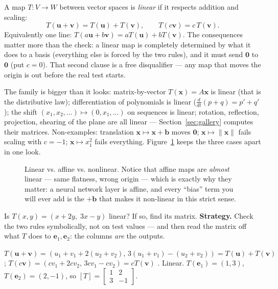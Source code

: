 A map $T:V\to W$ between vector spaces is \emph{linear} if it respects addition and scaling:
\[
  T(\mathbf{u}+\mathbf{v}) = T(\mathbf{u})+T(\mathbf{v}),\qquad
  T(c\mathbf{v}) = c\,T(\mathbf{v}).
\]
Equivalently one line: $T(a\mathbf{u}+b\mathbf{v})=aT(\mathbf{u})+bT(\mathbf{v})$. The consequences matter more than the check: a linear map is completely determined by what it does to a basis (everything else is forced by the two rules), and it must send $\mathbf 0$ to $\mathbf 0$ (put $c=0$). That second clause is a free disqualifier — any map that moves the origin is out before the real test starts.

The family is bigger than it looks: matrix-by-vector $T(\mathbf{x})=A\mathbf{x}$ is linear (that is the distributive law); differentiation of polynomials is linear ($\frac{d}{dt}(p+q)=p'+q'$); the shift $(x_1,x_2,\dots)\mapsto(0,x_1,\dots)$ on sequences is linear; rotation, reflection, projection, shearing of the plane are all linear — Section~\ref{sec:gallery} computes their matrices. Non-examples: translation $\mathbf{x}\mapsto\mathbf{x}+\mathbf{b}$ moves $\mathbf 0$; $\mathbf{x}\mapsto\|\mathbf{x}\|$ fails scaling with $c=-1$; $\mathbf{x}\mapsto x_1^2$ fails everything. Figure~\ref{fig:affine} keeps the three cases apart in one look.

\begin{figure}[htbp]
\centering

\caption{Linear vs. affine vs. nonlinear. Notice that affine maps are \emph{almost} linear — same flatness, wrong origin — which is exactly why they matter: a neural network layer is affine, and every ``bias'' term you will ever add is the $+\mathbf b$ that makes it non-linear in this strict sense.}
\label{fig:affine}
\end{figure}

\begin{example}\label{ex:linverify}
Is $T(x,y)=(x+2y,\;3x-y)$ linear? If so, find its matrix.
\textbf{Strategy.} Check the two rules symbolically, not on test values — and then read the matrix off what $T$ does to $\mathbf e_1,\mathbf e_2$: the columns \emph{are} the outputs.
\begin{solution}
$T(\mathbf u+\mathbf v)=(u_1+v_1+2(u_2+v_2),\,3(u_1+v_1)-(u_2+v_2))=T(\mathbf u)+T(\mathbf v)$ \checkmark; $T(c\mathbf v)=(cv_1+2cv_2,\,3cv_1-cv_2)=cT(\mathbf v)$ \checkmark. Linear. $T(\mathbf e_1)=(1,3)$, $T(\mathbf e_2)=(2,-1)$, so
\(
[T]=\begin{bmatrix}1&2\\3&-1\end{bmatrix}.
\)
\end{solution}
\end{example}

